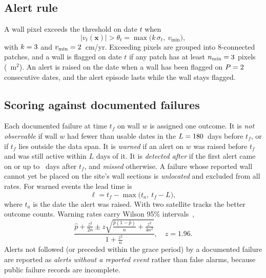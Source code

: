 \documentclass[aps,prd,twocolumn,superscriptaddress,nofootinbib,floatfix,preprintnumbers,10pt]{revtex4-2}
\begin{document}
\subsection{Alert rule}

A wall pixel exceeds the threshold on date $t$ when
\begin{equation}
|v_t(\bm{x})| > \theta_t = \max\!\big(k\,\sigma_t,\ v_{\min}\big),
\label{eq:thr}
\end{equation}
with $k=3$ and $v_{\min}=2$~cm/yr. Exceeding pixels are grouped into 8-connected patches, and a wall is flagged on date $t$ if any patch has at least $n_{\min}=3$ pixels (\PClusterArea~m$^2$). An alert is raised on the date when a wall has been flagged on $P=2$ consecutive dates, and the alert episode lasts while the wall stays flagged.

\subsection{Scoring against documented failures}

Each documented failure at time $t_f$ on wall $w$ is assigned one outcome. It is \emph{not observable} if wall $w$ had fewer than \PMinObs{} usable dates in the $L=180$~days before $t_f$, or if $t_f$ lies outside the data span. It is \emph{warned} if an alert on $w$ was raised before $t_f$ and was still active within $L$ days of it. It is \emph{detected after} if the first alert came on or up to \PGrace{}~days after $t_f$, and \emph{missed} otherwise. A failure whose reported wall cannot yet be placed on the site's wall sections is \emph{unlocated} and excluded from all rates. For warned events the lead time is
\begin{equation}
\ell = t_f - \max\!\big(t_a,\ t_f - L\big),
\label{eq:lead}
\end{equation}
where $t_a$ is the date the alert was raised. With two satellite tracks the better outcome counts. Warning rates carry Wilson 95\% intervals~\cite{Wilson1927},
\begin{equation}
\frac{\hat p + \frac{z^2}{2n} \pm z\sqrt{\frac{\hat p(1-\hat p)}{n}+\frac{z^2}{4n^2}}}{1+\frac{z^2}{n}},\quad z=1.96.
\label{eq:wilson}
\end{equation}
Alerts not followed (or preceded within the grace period) by a documented failure are reported as \emph{alerts without a reported event} rather than false alarms, because public failure records are incomplete.
\end{document}
